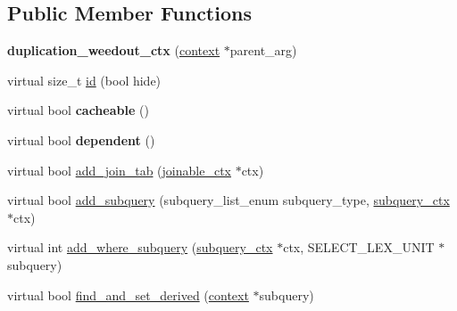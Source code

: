 \subsection*{Public Member Functions}
\begin{DoxyCompactItemize}
\item 
\mbox{\label{classopt__explain__json__namespace_1_1duplication__weedout__ctx_aa5b2115ba4b6a8f33b6d7c72f67f075c}} 
{\bfseries duplication\+\_\+weedout\+\_\+ctx} (\mbox{\hyperlink{classopt__explain__json__namespace_1_1context}{context}} $\ast$parent\+\_\+arg)
\item 
virtual size\+\_\+t \mbox{\hyperlink{classopt__explain__json__namespace_1_1duplication__weedout__ctx_ac1df854f614e849880a6449f5c92a98b}{id}} (bool hide)
\item 
\mbox{\label{classopt__explain__json__namespace_1_1duplication__weedout__ctx_a9f927f5fa92195c2cdc930227878ce81}} 
virtual bool {\bfseries cacheable} ()
\item 
\mbox{\label{classopt__explain__json__namespace_1_1duplication__weedout__ctx_a124c8c03d940891539d09853012d0ce9}} 
virtual bool {\bfseries dependent} ()
\item 
virtual bool \mbox{\hyperlink{classopt__explain__json__namespace_1_1duplication__weedout__ctx_a6b1d2505d9f83d8c4fcf56d7b58ebca0}{add\+\_\+join\+\_\+tab}} (\mbox{\hyperlink{classopt__explain__json__namespace_1_1joinable__ctx}{joinable\+\_\+ctx}} $\ast$ctx)
\item 
virtual bool \mbox{\hyperlink{classopt__explain__json__namespace_1_1duplication__weedout__ctx_a2b570476015c26f58d8b7ec13cc11b4d}{add\+\_\+subquery}} (subquery\+\_\+list\+\_\+enum subquery\+\_\+type, \mbox{\hyperlink{classopt__explain__json__namespace_1_1subquery__ctx}{subquery\+\_\+ctx}} $\ast$ctx)
\item 
virtual int \mbox{\hyperlink{classopt__explain__json__namespace_1_1duplication__weedout__ctx_ab9ed2cd6372ca07ead08bbe7ad56db22}{add\+\_\+where\+\_\+subquery}} (\mbox{\hyperlink{classopt__explain__json__namespace_1_1subquery__ctx}{subquery\+\_\+ctx}} $\ast$ctx, S\+E\+L\+E\+C\+T\+\_\+\+L\+E\+X\+\_\+\+U\+N\+IT $\ast$subquery)
\item 
virtual bool \mbox{\hyperlink{classopt__explain__json__namespace_1_1duplication__weedout__ctx_a2ff1982ca0d17cea2655f6273c229dd7}{find\+\_\+and\+\_\+set\+\_\+derived}} (\mbox{\hyperlink{classopt__explain__json__namespace_1_1context}{context}} $\ast$subquery)

\end{DoxyCompactItemize}
